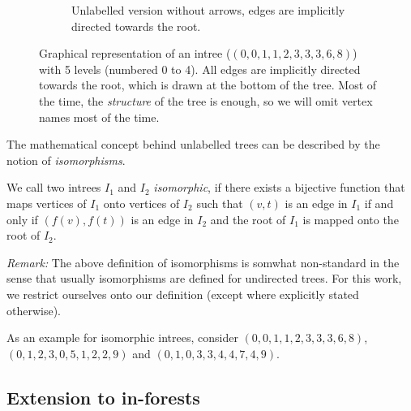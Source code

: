 \begin{figure}[t]
\begin{subfigure}{.45\textwidth}
    \caption{Unlabelled version without arrows, edges are implicitly directed towards the root.}
    \label{fig:intree-example-structure-version}
  \end{subfigure}
  \caption{Graphical representation of an intree ($(0,0,1,1,2,3,3,3,6,8)$) with 5 levels (numbered 0 to 4). All edges are implicitly directed towards the root, which is drawn at the bottom of the tree. Most of the time, the \emph{structure} of the tree is enough, so we will omit vertex names most of the time.}
  \label{fig:intrees-introductory-explanation}
\end{figure}

The mathematical concept behind unlabelled trees can be described by the notion of \emph{isomorphisms}.

\begin{definition}
  We call two intrees $I_1$ and $I_2$ \emph{isomorphic}, if there exists a bijective function that maps vertices of $I_1$ onto vertices of $I_2$ such that $(v,t)$ is an edge in $I_1$ if and only if $(f(v), f(t))$ is an edge in $I_2$ and the root of $I_1$ is mapped onto the root of $I_2$.
\end{definition}

\emph{Remark:} The above definition of isomorphisms is somwhat non-standard in the sense that usually isomorphisms are defined for undirected trees. For this work, we restrict ourselves onto our definition (except where explicitly stated otherwise).

As an example for isomorphic intrees, consider $(0,0,1,1,2,3,3,3,6,8)$, $(0,1,2,3,0,5,1,2,2,9)$ and $(0,1,0,3,3,4,4,7,4,9)$.

\subsection{Extension to in-forests}
\label{sec:intrees-extension-to-forests}

